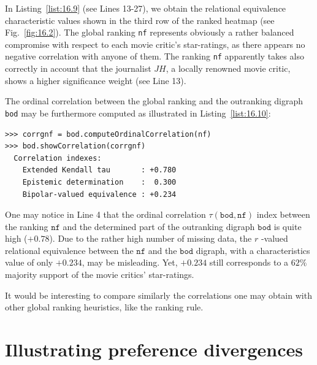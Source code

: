 In Listing~\vref{list:16.9} (see Lines 13-27), we obtain the relational equivalence characteristic values shown in the third row of the ranked heatmap (see Fig.~\vref{fig:16.2}). The global \NetFlows ranking \texttt{nf} represents obviously a rather balanced compromise with respect to each movie critic's star-ratings, as there appears no negative correlation with anyone of them. The ranking \texttt{nf} apparently takes also correctly in account that the journalist $JH$, a locally renowned movie critic, shows a higher significance weight (see Line 13).

The ordinal correlation between the global \NetFlows ranking and the outranking digraph \texttt{bod} may be furthermore computed as illustrated in Listing~\vref{list:16.10}: 
\begin{lstlisting}[caption={Computing the ordinal correlation between \NetFlows and global outranking digraph},label=list:16.10]
>>> corrgnf = bod.computeOrdinalCorrelation(nf)
>>> bod.showCorrelation(corrgnf)
  Correlation indexes:
    Extended Kendall tau       : +0.780
    Epistemic determination    :  0.300
    Bipolar-valued equivalence : +0.234
\end{lstlisting}

One may notice in Line 4 that the ordinal correlation $\tau(\mathtt{bod},\mathtt{nf})$ index between the \NetFlows ranking $\mathtt{nf}$ and the determined part of the outranking digraph $\mathtt{bod}$ is quite high ($+0.78$). Due to the rather high number of missing data, the $r$ -valued relational equivalence between the $\mathtt{nf}$ and the $\mathtt{bod}$ digraph, with a characteristics value of only $+0.234$, may be misleading. Yet, $+0.234$ still corresponds to a $62\%$ majority support of the movie critics' star-ratings.

It would be interesting to compare similarly the correlations one may obtain with other global ranking heuristics, like the \Copeland ranking rule.

\section{Illustrating preference divergences}
\label{sec:16.5}

